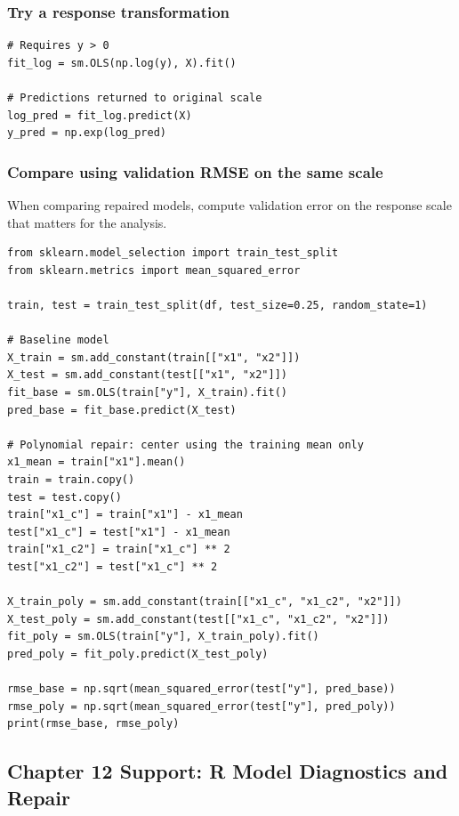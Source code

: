 \subsubsection*{Try a response transformation}

\begin{verbatim}
# Requires y > 0
fit_log = sm.OLS(np.log(y), X).fit()

# Predictions returned to original scale
log_pred = fit_log.predict(X)
y_pred = np.exp(log_pred)
\end{verbatim}

\subsubsection*{Compare using validation RMSE on the same scale}

When comparing repaired models, compute validation error on the response scale that matters for the analysis.

\begin{verbatim}
from sklearn.model_selection import train_test_split
from sklearn.metrics import mean_squared_error

train, test = train_test_split(df, test_size=0.25, random_state=1)

# Baseline model
X_train = sm.add_constant(train[["x1", "x2"]])
X_test = sm.add_constant(test[["x1", "x2"]])
fit_base = sm.OLS(train["y"], X_train).fit()
pred_base = fit_base.predict(X_test)

# Polynomial repair: center using the training mean only
x1_mean = train["x1"].mean()
train = train.copy()
test = test.copy()
train["x1_c"] = train["x1"] - x1_mean
test["x1_c"] = test["x1"] - x1_mean
train["x1_c2"] = train["x1_c"] ** 2
test["x1_c2"] = test["x1_c"] ** 2

X_train_poly = sm.add_constant(train[["x1_c", "x1_c2", "x2"]])
X_test_poly = sm.add_constant(test[["x1_c", "x1_c2", "x2"]])
fit_poly = sm.OLS(train["y"], X_train_poly).fit()
pred_poly = fit_poly.predict(X_test_poly)

rmse_base = np.sqrt(mean_squared_error(test["y"], pred_base))
rmse_poly = np.sqrt(mean_squared_error(test["y"], pred_poly))
print(rmse_base, rmse_poly)
\end{verbatim}

\subsection{Chapter 12 Support: R Model Diagnostics and Repair}
\label{app:ch12-software-cookbook-r}

